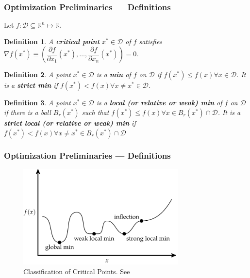 \documentclass[11pt,xcolor={svgnames},aspectratio=169,usepdftitle=false]{beamer}
\newtheorem{definition}{Definition}
\begin{document}
\begin{frame}
  \frametitle{Optimization Preliminaries --- Definitions}
Let $f : \mathcal{D}\subseteq\mathbb{R}^n \mapsto \mathbb{R}$. 

\begin{definition}
A \alert{\textbf{critical point}} $x^*\in\mathcal{D}$ of $f$ satisfies $\nabla f(x^*) \equiv \left(\dfrac{\partial f}{\partial x_1}(x^*), \ldots,\dfrac{\partial f}{\partial x_n}(x^*)\right) = 0$.
\end{definition}

\begin{definition}
A point $x^*\in\mathcal{D}$ is a \alert{\textbf{min}} of $f$ on $\mathcal{D}$ if $f(x^*)\leq f(x) \forall x\in\mathcal{D}$. It is a \alert{\textbf{strict min}} if $f(x^*) < f(x) \forall x\neq x^*\in\mathcal{D}$.
\end{definition}

\begin{definition}
A point $x^*\in\mathcal{D}$ is a \alert{\textbf{local (or relative or weak) min}} of $f$ on $\mathcal{D}$ if there is a ball $B_r(x^*)$ such that $f(x^*) \leq f(x) \forall x\in B_r(x^*)\cap\mathcal{D}$. It is a \alert{\textbf{strict local (or relative or weak) min}} if $f(x^*) < f(x) \forall x\neq x^*\in B_r(x^*)\cap\mathcal{D}$
\end{definition}
\end{frame}

\begin{frame}
  \frametitle{Optimization Preliminaries --- Definitions}
\begin{figure}
  \centering
    \includegraphics[width = 0.75\textwidth]{../figures/classification_critical_points.png}
    \caption{Classification of Critical Points. See \cite{kochenderfer2019optimization}}
\end{figure}
\end{frame}
\end{document}
